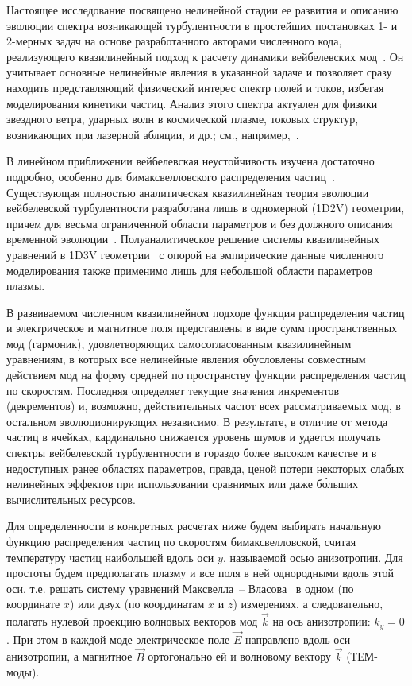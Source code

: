 Настоящее исследование посвящено нелинейной стадии ее развития и описанию эволюции спектра возникающей турбулентности в простейших постановках 1- и 2-мерных задач на основе разработанного авторами численного кода, реализующего квазилинейный подход к расчету динамики вейбелевских мод~\cite{Kuznetsov2022}.
Он учитывает основные нелинейные явления в указанной задаче и позволяет сразу находить представляющий физический интерес спектр полей и токов, избегая моделирования кинетики частиц. 
Анализ этого спектра актуален для физики звездного ветра, ударных волн в космической плазме, токовых структур, возникающих при лазерной абляции, и др.; см., например,~\cite{Lazar2022,Romanov2004,Medvedev2005,Chatterjee2017}.

В линейном приближении вейбелевская неустойчивость изучена достаточно подробно, особенно для бимаксвелловского распределения частиц~\cite{Weibel1959,Fried1959,Vagin2014}. Существующая полностью аналитическая квазилинейная теория эволюции вейбелевской турбулентности разработана лишь в одномерной (1D2V) геометрии, причем для весьма ограниченной области параметров и без должного описания временной эволюции~\cite{Pokhotelov2011}. Полуаналитическое решение системы квазилинейных уравнений в 1D3V геометрии~\cite{Ruyer2015} с опорой на эмпирические данные численного моделирования также применимо лишь для небольшой области параметров плазмы. 

В развиваемом численном квазилинейном подходе функция распределения частиц и электрическое и магнитное поля представлены в виде сумм пространственных мод (гармоник), удовлетворяющих самосогласованным квазилинейным уравнениям, в которых все нелинейные явления обусловлены совместным действием мод на форму средней по пространству функции распределения частиц по скоростям. Последняя определяет текущие значения инкрементов (декрементов) и, возможно, действительных частот всех рассматриваемых мод, в остальном эволюционирующих независимо. В результате, в отличие от метода частиц в ячейках, кардинально снижается уровень шумов и удается получать спектры вейбелевской турбулентности в гораздо более высоком качестве и в недоступных ранее областях параметров, правда, ценой потери некоторых слабых нелинейных эффектов при использовании сравнимых или даже б\'{о}льших вычислительных ресурсов.

Для определенности в конкретных расчетах ниже будем выбирать начальную функцию распределения частиц по скоростям бимаксвелловской, считая температуру частиц наибольшей вдоль оси $y$, называемой осью анизотропии. Для простоты будем предполагать плазму и все поля в ней однородными вдоль этой оси, т.е. решать систему уравнений Максвелла~-- Власова~\cite{Baumjohann2012} в одном (по координате $x$) или двух (по координатам $x$ и $z$) измерениях, а следовательно, полагать нулевой проекцию волновых векторов мод $\vec{k}$ на ось анизотропии: $k_y=0$. При этом в каждой моде электрическое поле $\vec{E}$ направлено вдоль оси анизотропии, а магнитное $\vec{B}$ ортогонально ей и волновому вектору $\vec{k}$ (ТЕМ-моды). 

